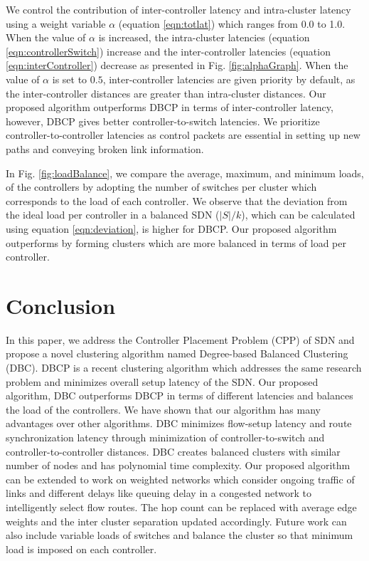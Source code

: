 \documentclass{IEEEtran}
\begin{document}
	We control the contribution of inter-controller latency and intra-cluster latency using a weight variable $\alpha$ (equation \ref{eqn:totlat}) which ranges from 0.0 to 1.0. When the value of $\alpha$ is increased, the intra-cluster latencies (equation \ref{eqn:controllerSwitch}) increase and the inter-controller latencies (equation \ref{eqn:interController}) decrease as presented in Fig. \ref{fig:alphaGraph}. When the value of $\alpha$ is set to $0.5$, inter-controller latencies are given priority by default, as the inter-controller distances are greater than intra-cluster distances. Our proposed algorithm outperforms DBCP in terms of inter-controller latency, however, DBCP gives better controller-to-switch latencies. We prioritize controller-to-controller latencies as control packets are essential in setting up new paths and conveying broken link information.
	
	In Fig. \ref{fig:loadBalance}, we compare the average, maximum, and minimum loads, of the controllers by adopting the number of switches per cluster which corresponds to the load of each controller. We observe that the deviation from the ideal load per controller in a balanced SDN ($|S|/k$), which can be calculated using equation \ref{eqn:deviation}, is higher for DBCP. Our proposed algorithm outperforms by forming clusters which are more balanced in terms of load per controller.
	
	\section{Conclusion} \label{conclusion}
	In this paper, we address the Controller Placement Problem (CPP) of SDN and propose a novel clustering algorithm named Degree-based Balanced Clustering (DBC). DBCP is a recent clustering algorithm which addresses the same research problem and minimizes overall setup latency of the SDN. Our proposed algorithm, DBC outperforms DBCP in terms of different latencies and balances the load of the controllers. We have shown that our algorithm has many advantages over other algorithms. DBC minimizes flow-setup latency and route synchronization latency through minimization of controller-to-switch and controller-to-controller distances. DBC creates balanced clusters with similar number of nodes and has polynomial time complexity.
	Our proposed algorithm can be extended to work on weighted networks which consider ongoing traffic of links and different delays like queuing delay in a congested network to intelligently select flow routes. The hop count can be replaced with average edge weights and the inter cluster separation updated accordingly. Future work can also include variable loads of switches and balance the cluster so that minimum load is imposed on each controller.
	
	
	
\end{document}
